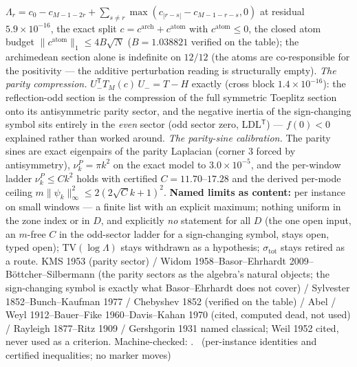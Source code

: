 $\Lambda_r=c_0-c_{M-1-2r}+\sum_{s\ne r}\max(c_{|r-s|}-c_{M-1-r-s},0)$ at
residual $5.9\times10^{-16}$, the exact split
$c=c^{\mathrm{arch}}+c^{\mathrm{atom}}$ with $c^{\mathrm{atom}}\le0$, the
closed atom budget $\|c^{\mathrm{atom}}\|_1\le4B\sqrt N$ ($B=1.038821$
verified on the table); the archimedean section alone is indefinite on
$12/12$ (the atoms are co-responsible for the positivity --- the additive
perturbation reading is structurally empty).
\emph{The parity compression.} $U_-^{\mathsf T}T_M(c)\,U_-=T-H$ exactly
(cross block $1.4\times10^{-16}$): the reflection-odd section is the
compression of the full symmetric Toeplitz section onto its antisymmetric
parity sector, and the negative inertia of the sign-changing symbol sits
entirely in the \emph{even} sector (odd sector zero, LDL$^{\mathsf T}$) ---
$f(0)<0$ explained rather than worked around.
\emph{The parity-sine calibration.} The parity sines are exact eigenpairs of
the parity Laplacian (corner $3$ forced by antisymmetry), $\nu^P_k=\pi k^2$
on the exact model to $3.0\times10^{-5}$, and the per-window ladder
$\nu^P_k\le Ck^2$ holds with certified $C=11.70$--$17.28$ and the derived
per-mode ceiling $m\|\psi_k\|_\infty^2\le2(2\sqrt Ck+1)^2$.
\textbf{Named limits as content:} per instance on small windows --- a finite
list with an explicit maximum; nothing uniform in the zone index or in $D$,
and explicitly \emph{no} statement for all $D$ (the one open input, an
$m$-free $C$ in the odd-sector ladder for a sign-changing symbol, stays
open, typed open); $\mathrm{TV}(\log\Lambda)$ stays withdrawn as a
hypothesis; $\sigma_{\mathrm{tot}}$ stays retired as a route.
KMS 1953 (parity sector) / Widom 1958--Basor--Ehrhardt
2009--B\"ottcher--Silbermann (the parity sectors as the algebra's natural
objects; the sign-changing symbol is exactly what Basor--Ehrhardt does not
cover) / Sylvester 1852--Bunch--Kaufman 1977 / Chebyshev 1852 (verified on
the table) / Abel / Weyl 1912--Bauer--Fike 1960--Davis--Kahan 1970 (cited,
computed dead, not used) / Rayleigh 1877--Ritz 1909 / Gershgorin 1931 named
classical; Weil 1952 cited, never used as a criterion.
Machine-checked:
.
\mE\ (per-instance identities and certified inequalities; no marker moves)


